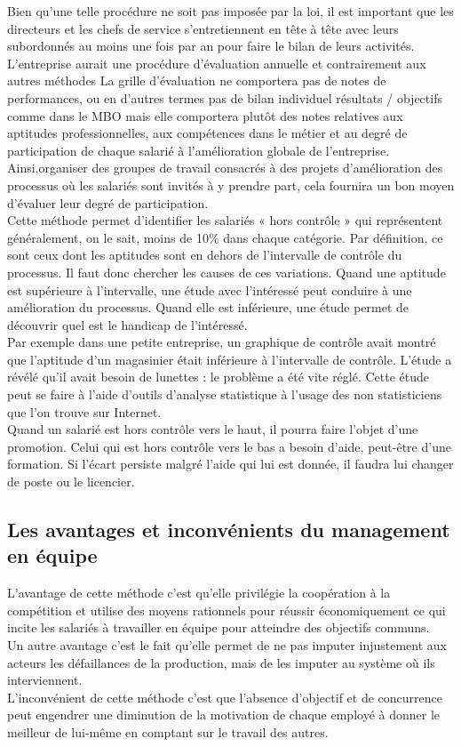 Bien qu’une telle procédure ne soit pas imposée par la loi, il est important que les directeurs et les chefs de service s’entretiennent en tête à tête avec leurs subordonnés au moins une fois par an pour faire le bilan de leurs activités. \\
L’entreprise aurait une procédure d’évaluation annuelle et contrairement aux autres méthodes  La grille d’évaluation ne comportera pas de notes de performances, ou en d’autres termes pas de bilan individuel résultats / objectifs comme dans le MBO mais elle comportera plutôt des notes relatives aux aptitudes professionnelles, aux compétences dans le métier et au degré de participation de chaque salarié à l’amélioration globale de l’entreprise. \\
Ainsi,organiser des groupes de travail consacrés à des projets d’amélioration des processus où les salariés sont invités à y prendre part, cela fournira un bon moyen d’évaluer leur degré de participation.\\
Cette méthode permet d’identifier les salariés « hors contrôle » qui représentent généralement, on le sait, moins de 10\% dans chaque catégorie. Par définition, ce sont ceux dont les aptitudes sont en dehors de l’intervalle de contrôle du processus. Il faut donc chercher les causes de ces variations. Quand une aptitude est supérieure à l’intervalle, une étude avec l’intéressé peut conduire à une amélioration du processus. Quand elle est inférieure, une étude permet de découvrir quel est le handicap de l’intéressé.\\ 
Par exemple dans une petite entreprise, un graphique de contrôle avait montré que l’aptitude d’un magasinier était inférieure à l’intervalle de contrôle. L’étude a révélé qu’il avait besoin de lunettes : le problème a été vite réglé. Cette étude peut se faire à l’aide d’outils d’analyse statistique à l’usage des non statisticiens que l’on trouve sur Internet.\\ 
Quand un salarié est hors contrôle vers le haut, il pourra faire l’objet d’une promotion. Celui qui est hors contrôle vers le bas a besoin d’aide, peut-être d’une formation. Si l’écart persiste malgré l’aide qui lui est donnée, il faudra lui  changer de poste ou le licencier.
\newpage
\subsection{Les avantages et inconvénients du management en équipe}
L’avantage de cette méthode c’est qu’elle privilégie la coopération à la compétition et utilise  des moyens rationnels pour réussir économiquement ce qui incite les salariés à travailler en équipe pour atteindre des objectifs communs.\\
Un autre avantage c’est le fait qu’elle permet de ne pas imputer injustement aux acteurs les défaillances de la production, mais de les imputer au système où ils interviennent.\\ 
L’inconvénient de cette méthode c’est que l’absence d’objectif et  de concurrence  peut engendrer une diminution de la motivation de chaque employé à donner le meilleur de lui-même en comptant sur le travail des autres.

